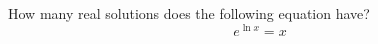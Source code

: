 \documentclass{ximera}
\author{David Kish}
\begin{document}
\begin{exercise}
How many real solutions does the following equation have? \\
\[
e^{\ln{x}}=x
\]
\begin{multipleChoice}  
\end{multipleChoice}  
\end{exercise}
\end{document}
